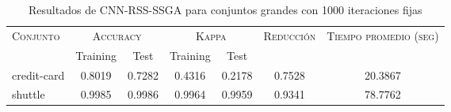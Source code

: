 \begin{table}[]
\centering
\begin{tabular}{l c c c c c c}
\hline
\multirow{2}{*}{\textsc{Conjunto}}
	& \multicolumn{2}{c}{\textsc{Accuracy}}
	& \multicolumn{2}{c}{\textsc{Kappa}}
	& \textsc{Reducción}
	& \textsc{Tiempo promedio (seg)} \\
	& Training & Test
	& Training & Test \\ 
\hline
\hline

credit-card & 0.8019 & 0.7282 & 0.4316 & 0.2178 & 0.7528 & 20.3867 \\
shuttle & 0.9985 & 0.9986 & 0.9964 & 0.9959 & 0.9341 & 78.7762 \\

\hline
\end{tabular}
\caption{Resultados de CNN-RSS-SSGA para conjuntos grandes con 1000 iteraciones fijas}
\label{res-grande-CNN-RSS-ssga}
\end{table}

